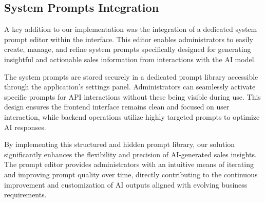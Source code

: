 \subsection{System Prompts Integration}

A key addition to our implementation was the integration of a dedicated system prompt editor within the interface. This editor enables administrators to easily create, manage, and refine system prompts specifically designed for generating insightful and actionable sales information from interactions with the AI model.

The system prompts are stored securely in a dedicated prompt library accessible through the application's settings panel. Administrators can seamlessly activate specific prompts for API interactions without these being visible during use. This design ensures the frontend interface remains clean and focused on user interaction, while backend operations utilize highly targeted prompts to optimize AI responses.

By implementing this structured and hidden prompt library, our solution significantly enhances the flexibility and precision of AI-generated sales insights. The prompt editor provides administrators with an intuitive means of iterating and improving prompt quality over time, directly contributing to the continuous improvement and customization of AI outputs aligned with evolving business requirements.
